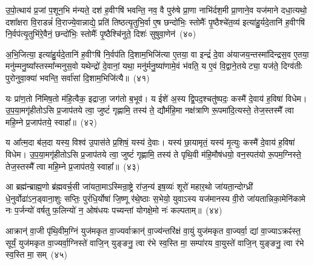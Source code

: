 {%
उ॒पो॒त्थाय॑ प्र॒जां प॒शून॒भि म॑न्यते॒ दश॑ ह॒वीꣳषि॑ भवन्ति॒ नव॒ वै पुरु॑षे प्रा॒णा नाभि॑र्दश॒मी प्रा॒णाने॒व यज॑माने दधा॒त्यथो॒ दशा᳚क्षरा वि॒राडन्नं॑ वि॒राज्ये॒वान्नाद्ये॒ प्रति॑ तिष्ठत्यृ॒तुभि॒र्वा ए॒ष छन्दो॑भिः॒ स्तोमैः᳚ पृ॒ष्ठैश्चे॑त॒व्य॑ इत्या॑हु॒र्यदे॒तानि॑ ह॒वीꣳषि॑ नि॒र्वप॑त्यृ॒तुभि॑रे॒वैनं॒ छन्दो॑भिः॒ स्तोमैः᳚ पृ॒ष्ठैश्चि॑नुते॒ दिशः॑ सुषुवा॒णेन॑~(४०)

अ॒भि॒जित्या॒ इत्या॑हु॒र्यदे॒तानि॑ ह॒वीꣳषि॑ नि॒र्वप॑ति दि॒शाम॒भिजि॑त्या ए॒तया॒ वा इन्द्रं॑ दे॒वा अ॑याजय॒न्तस्मा॑दिन्द्रस॒व ए॒तया॒ मनु॑म्मनु॒ष्या᳚स्तस्मा᳚न्मनुस॒वो यथेन्द्रो॑ दे॒वानां॒ यथा॒ मनु॑र्मनु॒ष्या॑णामे॒वं भ॑वति॒ य ए॒वं वि॒द्वाने॒तयेट्या॒ यज॑ते॒ दिग्व॑तीः पुरोनुवा॒क्या॑ भवन्ति॒ सर्वा॑सां दि॒शाम॒भिजि॑त्यै॥~(४१)

{\anuvakamend[{अशा᳚न्तः सुषुवा॒णेनैक॑चत्वारिꣳशच्च}]}%

यः प्रा॑ण॒तो नि॑मिष॒तो म॑हि॒त्वैक॒ इद्राजा॒ जग॑तो ब॒भूव॑। य ईशे॑ अ॒स्य द्वि॒पद॒श्चतु॑ष्पदः॒ कस्मै॑ दे॒वाय॑ ह॒विषा॑ विधेम। उ॒प॒या॒मगृ॑हीतो\-ऽसि प्र॒जाप॑तये त्वा॒ जुष्टं॑ गृह्णामि॒ तस्य॑ ते॒ द्यौर्म॑हि॒मा नक्ष॑त्राणि रू॒पमा॑दि॒त्यस्ते॒ तेज॒स्तस्मै᳚ त्वा महि॒म्ने प्र॒जाप॑तये॒ स्वाहा᳚॥~(४२)

{\anuvakamend[{यः प्रा॑ण॒तो द्यौरा॑दि॒त्यो᳚\-ऽष्टात्रिꣳ॑शत्}]}%

य आ᳚त्म॒दा ब॑ल॒दा यस्य॒ विश्व॑ उ॒पास॑ते प्र॒शिषं॒ यस्य॑ दे॒वाः। यस्य॑ छा॒यामृतं॒ यस्य॑ मृ॒त्युः कस्मै॑ दे॒वाय॑ ह॒विषा॑ विधेम। उ॒प॒या॒मगृ॑हीतो\-ऽसि प्र॒जाप॑तये त्वा॒ जुष्टं॑ गृह्णामि॒ तस्य॑ ते पृथि॒वी म॑हि॒मौष॑धयो॒ वन॒स्पत॑यो रू॒पम॒ग्निस्ते॒ तेज॒स्तस्मै᳚ त्वा महि॒म्ने प्र॒जाप॑तये॒ स्वाहा᳚॥~(४३)

{\anuvakamend[{य आ᳚त्म॒दाः पृ॑थि॒व्य॑ग्निरेका॒न्नच॑त्वारि॒ꣳ॒शत्}]}%

आ ब्रह्म॑न्ब्राह्म॒णो ब्र॑ह्मवर्च॒सी जा॑यता॒मा\-ऽस्मिन्रा॒ष्ट्रे रा॑ज॒न्य॑ इष॒व्यः॑ शूरो॑ महार॒थो जा॑यता॒न्दोग्ध्री॑ धे॒नुर्वोढा॑\-ऽ\-न॒ड्वाना॒शुः सप्तिः॒ पुरं॑धि॒र्योषा॑ जि॒ष्णू र॑थे॒ष्ठाः स॒भेयो॒ युवा\-ऽस्य यज॑मानस्य वी॒रो जा॑यतान्निका॒मेनि॑कामे नः प॒र्जन्यो॑ वर्\mbox{}षतु फ॒लिन्यो॑ न॒ ओष॑धयः पच्यन्तां योगक्षे॒मो नः॑ कल्पताम्॥~(४४)

{\anuvakamend[{आ ब्रह्म॒न्नेक॑चत्वारिꣳशत्}]}%

आक्रान्॑ वा॒जी पृ॑थि॒वीम॒ग्निं युज॑मकृत वा॒ज्यर्वाक्रान्॑ वा॒ज्य॑न्तरि॑क्षं वा॒युं युज॑मकृत वा॒ज्यर्वा॒ द्यां वा॒ज्या\-ऽक्रꣴ॑स्त॒ सूर्यं॒ युज॑मकृत वा॒ज्यर्वा॒ग्निस्ते॑ वाजि॒न् युङ्ङनु॒ त्वा र॑भे स्व॒स्ति मा॒ सम्पा॑रय वा॒युस्ते॑ वाजि॒न् युङ्ङनु॒ त्वा र॑भे स्व॒स्ति मा॒ सम्~(४५)

}
